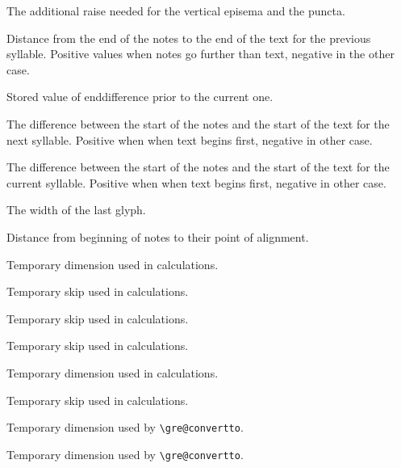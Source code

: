 The additional raise needed for the vertical episema and the puncta.

Distance from the end of the notes to the end of the text for the previous syllable.  Positive values when notes go further than text, negative in the other case.

Stored value of enddifference prior to the current one.

The difference between the start of the notes and the start of the text for the next syllable.  Positive when when text begins first, negative in other case.

The difference between the start of the notes and the start of the text for the current syllable.  Positive when when text begins first, negative in other case.

The width of the last glyph.

Distance from beginning of notes to their point of alignment.

Temporary dimension used in calculations.

Temporary skip used in calculations.

Temporary skip used in calculations.

Temporary skip used in calculations.

Temporary dimension used in calculations.

Temporary skip used in calculations.

Temporary dimension used by \verb=\gre@convertto=.

Temporary dimension used by \verb=\gre@convertto=.

